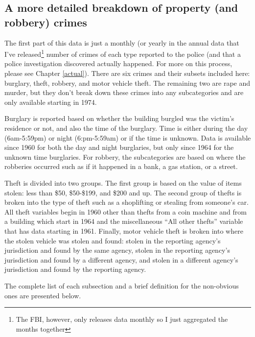 \documentclass[
]{krantz}
\begin{document}
\subsection{A more detailed breakdown of property (and
robbery) crimes}\label{propertycount}

The first part of this data is just a monthly (or yearly in
the annual data that I've released\footnote{The FBI,
  however, only releases data monthly so I just aggregated
  the months together} number of crimes of each type
reported to the police (and that a police investigation
discovered actually happened. For more on this process,
please see Chapter \ref{actual}). There are six crimes and
their subsets included here: burglary, theft, robbery, and
motor vehicle theft. The remaining two are rape and murder,
but they don't break down these crimes into any
subcategories and are only available starting in 1974.

Burglary is reported based on whether the building burgled
was the victim's residence or not, and also the time of the
burglary. Time is either during the day (6am-5:59pm) or
night (6:pm-5:59am) or if the time is unknown. Data is
available since 1960 for both the day and night burglaries,
but only since 1964 for the unknown time burglaries. For
robbery, the subcategories are based on where the robberies
occurred such as if it happened in a bank, a gas station, or
a street.

Theft is divided into two groups. The first group is based
on the value of items stolen: less than \$50, \$50-\$199,
and \$200 and up. The second group of thefts is broken into
the type of theft such as a shoplifting or stealing from
someone's car. All theft variables begin in 1960 other than
thefts from a coin machine and from a building which start
in 1964 and the miscellaneous ``All other thefts'' variable
that has data starting in 1961. Finally, motor vehicle theft
is broken into where the stolen vehicle was stolen and
found: stolen in the reporting agency's jurisdiction and
found by the same agency, stolen in the reporting agency's
jurisdiction and found by a different agency, and stolen in
a different agency's jurisdiction and found by the reporting
agency.

The complete list of each subsection and a brief definition
for the non-obvious ones are presented below.
\end{document}
